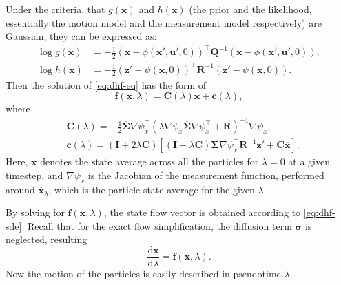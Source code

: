Under the criteria, that $g(\mathbf{x})$ and $h(\mathbf{x})$ (the prior and the likelihood, essentially the motion model and the measurement model respectively) are Gaussian,
they can be expressed as:
\begin{align}
    \log g(\mathbf{x}) & =-\frac{1}{2}(\mathbf{x}-\phi(\mathbf{x}',\mathbf{u}',0))^{\top} \mathbf{Q}^{-1}(\mathbf{x}-\phi(\mathbf{x}',\mathbf{u}',0)),            \\
    \log h(\mathbf{x}) & =-\frac{1}{2}(\mathbf{z}'-\psi(\mathbf{x},0))^{\top} \mathbf{R}^{-1}(\mathbf{z}'-\psi(\mathbf{x},0)). \label{eq:explicit-log-likelihood}
\end{align}
Then the solution of \eqref{eq:dhf-eq} has the form of
\begin{equation}\label{eq:edh-flow-vector}
    \mathbf{f}(\mathbf{x},\lambda) = \mathbf{C}(\lambda)\mathbf{x} + \mathbf{c}(\lambda),
\end{equation}
where
\begin{align}
     & \mathbf{C}(\lambda) = -\frac{1}{2}\mathbf{\mathbf{\overline\Sigma}}\nabla \psi_x^\top\left(\lambda \nabla \psi_x\mathbf{\overline\Sigma}\nabla \psi_x^\top + \mathbf{R}\right)^{-1}\nabla \psi_x,\label{eq:edh-C}                              \\
     & \mathbf{c}(\lambda) = \left(\mathbf{I}+2\lambda\mathbf{C}\right)\left[\left(\mathbf{I}+\lambda\mathbf{C}\right)\mathbf{\overline\Sigma}\nabla \psi_x^\top\mathbf{R}^{-1}\mathbf{z}' + \mathbf{C}\overline{\mathbf{x}}\right]. \label{eq:edh-c}
\end{align}
Here, $\overline{\mathbf{x}}$ denotes the state average across all the particles for $\lambda = 0$ at a given timestep,
and $\nabla \psi_x$ is the Jacobian of the measurement function, performed around $\overline{\mathbf{x}}_\lambda$,
which is the particle state average for the given $\lambda$.

By solving for $\mathbf{f}(\mathbf{x},\lambda)$,
the state flow vector is obtained according to \eqref{eq:dhf-sde}.
Recall that for the exact flow simplification, the diffusion term $\boldsymbol\sigma$ is
neglected, resulting
\begin{equation}
    \frac{\mathrm{d}\mathbf{x}}{\mathrm{d}\lambda} = \mathbf{f}(\mathbf{x},\lambda).
\end{equation}
Now the motion of the particles is easily described in pseudotime $\lambda$.

